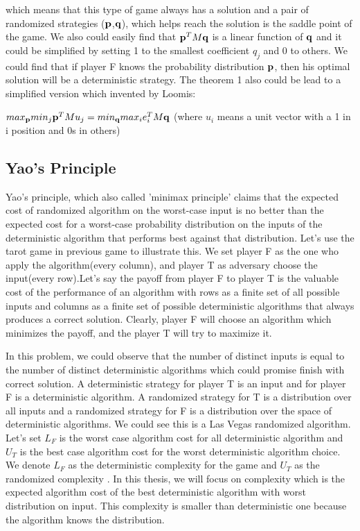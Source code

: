 which means that this type of game always has a solution and a pair of randomized strategies ($\mathbf{p}$,$\mathbf{q}$), which helps reach the solution is the saddle point of the game. We also could easily find that $\mathbf{p}^TM\mathbf{q}$ is a linear function of $\mathbf{q}$ and it could be simplified by setting 1 to the smallest coefficient $q_j$ and 0 to others. We could find that if player F knows the probability distribution $\mathbf{p}$, then his optimal solution will be a deterministic strategy. The theorem 1 also could be lead to a simplified version which invented by Loomis\cite{LOOMIS}:
\begin{theorem}
		$max_{\mathbf{p}}min_{j}\mathbf{p}^TMu_j = min_{\mathbf{q}}max_{i}e_{i}^{T}M\mathbf{q}$ (where $u_i$ means a unit vector with a 1 in i position and 0s in others)
\end{theorem}
\subsection{Yao's Principle}
Yao's principle, which also called 'minimax principle' claims that the expected cost of randomized algorithm on the worst-case input is no better than the expected cost for a worst-case probability distribution on the inputs of the deterministic algorithm that performs best against that distribution.\cite{YAO} Let's use the tarot game in previous game to illustrate this. We set player F as the one who apply the algorithm(every column), and player T as adversary choose the input(every row).Let's say the payoff from player F to player T is the valuable cost of the performance of an algorithm with rows as a finite set of all possible inputs and columns as a finite set of possible deterministic algorithms that always produces a correct solution. Clearly, player F will choose an algorithm which minimizes the payoff, and the  player T will try to maximize it.

In this problem, we could observe that the number of distinct inputs is equal to the number of distinct deterministic algorithms which could promise finish with correct solution. A deterministic strategy for player T is an input and for player F is a deterministic algorithm. A randomized strategy for T is a distribution over all inputs and a randomized strategy for F is a distribution over the space of deterministic algorithms\cite{M}. We could see this is a Las Vegas randomized algorithm\cite{LAS}. Let's set $L_F$ is the worst case algorithm cost for all deterministic algorithm and $U_T$ is the best case algorithm cost for the worst deterministic algorithm choice. We denote $L_F$ as the deterministic complexity for the game and $U_T$ as the randomized complexity \cite{S}. In this thesis, we will focus on complexity which is the expected algorithm cost of the best deterministic algorithm with worst distribution on input\cite{MT}. This  complexity is smaller than deterministic one because the algorithm knows the distribution.\cite{YAOC}

